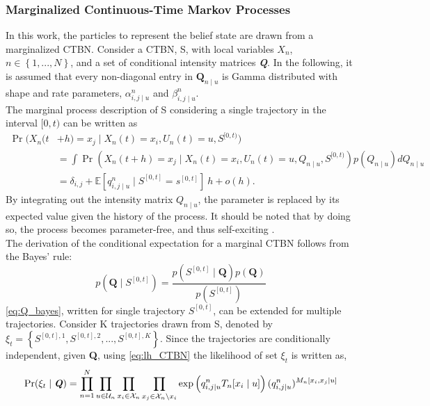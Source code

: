 \subsubsection{Marginalized Continuous-Time Markov Processes}
\label{sec:marg_ctbn}
In this work, the particles to represent the belief state are drawn from a marginalized CTBN. Consider a CTBN, S, with local variables $ X_n $, $ n\in \left\lbrace 1,...,N \right\rbrace $, and a set of conditional intensity matrices \textbf{\textit{Q}}. In the following, it is assumed that every non-diagonal entry in $ \textbf{Q}_{n\mid u} $ is Gamma distributed with shape and rate parameters, $ \alpha^n_{i,j\mid u} $ and $ \beta^n_{i,j\mid u} $.\\
The marginal process description of S considering a single trajectory in the interval $ [0,t) $ can be written as
\begin{align}
\operatorname{Pr}(X_n(t &+ h) = x_j \mid X_n(t)=x_i, U_n(t)=u, S^{[0, t)})\\
&= \int \operatorname{Pr}(X_n(t + h) = x_j \mid X_n(t)=x_i, U_n(t)=u, Q_{n\mid u}, S^{[0, t)})p(Q_{n\mid u})dQ_{n\mid u}\\
&= \delta_{i,j} + \mathbb{E}[q^n_{i,j\mid u} \mid S^{[0, t]} = s^{[0, t]}]\ h + o(h).
\label{eq:marginal_CTBN}
\end{align}
By integrating out the intensity matrix $ Q_{n\mid u} $, the parameter is replaced by its expected value given the history of the process. It should be noted that by doing so, the process becomes parameter-free, and thus self-exciting \cite{Studer2016}. \\
The derivation of the conditional expectation for a marginal CTBN follows from the Bayes' rule:
\begin{equation}
p\left(\textbf{Q} \mid S^{[0,t]}\right)=\frac{p\left(S^{[0,t]} \mid \textbf{Q}\right) p(\textbf{Q})}{p\left(S^{[0,t]}\right)}
\label{eq:Q_bayes}
\end{equation}
\autoref{eq:Q_bayes}, written for single trajectory $ S^{[0,t]} $, can be extended for multiple trajectories. Consider K trajectories drawn from S, denoted by $ \xi_t = \left\lbrace S^{[0,t], 1}, S^{[0,t], 2}, ..., S^{[0,t], K} \right\rbrace  $. Since the trajectories are conditionally independent, given \textbf{Q}, using \autoref{eq:lh_CTBN} the likelihood of set $ \xi_t $ is written as,
\begin{align}
\operatorname{Pr}( \xi_t  \mid \textbf{\textit{Q}} ) = \prod_{n=1}^{N} \prod_{u \in \mathcal{U}_{n}} \prod_{x_i \in \mathcal{X}_{n}} \prod_{x_j \in \mathcal{X}_{n} \backslash x_i}
\exp \left( q_{i,j\mid u}^{n} T_{n}[x_i\mid u]\right) (q_{i,j\mid u}^{n})^{M_{n}[x_i, x_j\mid u]}
\label{eq:lh_dataset_CTBN}
\end{align}
